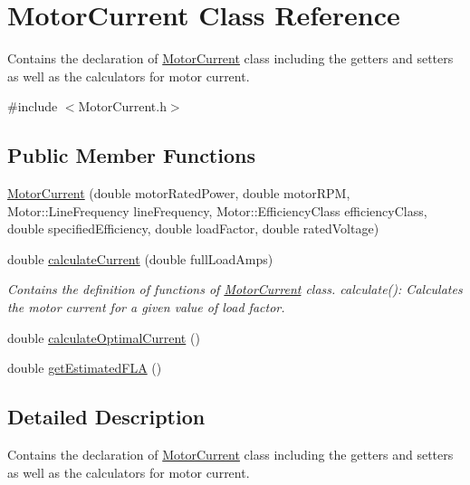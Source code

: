 \hypertarget{class_motor_current}{}\section{Motor\+Current Class Reference}
\label{class_motor_current}


Contains the declaration of \hyperlink{class_motor_current}{Motor\+Current} class including the getters and setters as well as the calculators for motor current.  




{\ttfamily \#include $<$Motor\+Current.\+h$>$}

\subsection*{Public Member Functions}
\begin{DoxyCompactItemize}
\item 
\hyperlink{class_motor_current_a9b6c25ee190196044e229b34a03d2af1}{Motor\+Current} (double motor\+Rated\+Power, double motor\+R\+PM, Motor\+::\+Line\+Frequency line\+Frequency, Motor\+::\+Efficiency\+Class efficiency\+Class, double specified\+Efficiency, double load\+Factor, double rated\+Voltage)
\item 
double \hyperlink{class_motor_current_aa08b2f8ba065b24908c7e1b80cadb4f6}{calculate\+Current} (double full\+Load\+Amps)
\begin{DoxyCompactList}\small\item\em Contains the definition of functions of \hyperlink{class_motor_current}{Motor\+Current} class. calculate()\+: Calculates the motor current for a given value of load factor. \end{DoxyCompactList}\item 
double \hyperlink{class_motor_current_a40638a00e4d21b34c74f8406f4e70046}{calculate\+Optimal\+Current} ()
\item 
double \hyperlink{class_motor_current_a0f845ec03585b21a8e476ed3e63f365f}{get\+Estimated\+F\+LA} ()
\end{DoxyCompactItemize}


\subsection{Detailed Description}
Contains the declaration of \hyperlink{class_motor_current}{Motor\+Current} class including the getters and setters as well as the calculators for motor current. 

